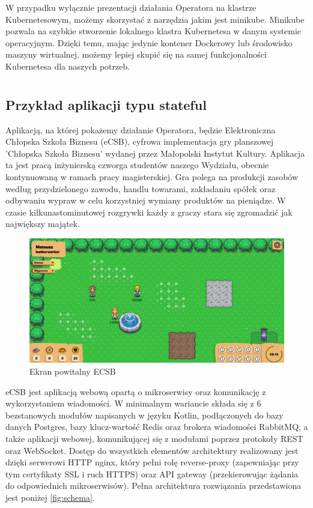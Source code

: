 \documentclass[polish]{aghengthesis}
\begin{document}
W przypadku wyłącznie prezentacji działania Operatora na klastrze Kubernetesowym, możemy skorzystać z narzędzia jakim jest minikube. Minikube pozwala na szybkie stworzenie lokalnego klastra Kubernetesa w danym systemie operacyjnym. Dzięki temu, mając jedynie kontener Dockerowy lub środowisko maszyny wirtualnej, możemy lepiej skupić się na samej funkcjonalności Kubernetesa dla naszych potrzeb. \cite{minikube}

\chapter{\ChapterTitleCaseStudyDesc}
\label{sec:opis-studium-przypadku}

\section{Przykład aplikacji typu stateful}
Aplikacją, na której pokażemy działanie Operatora, będzie Elektroniczna Chłopska Szkoła Biznesu (eCSB), cyfrowa implementacja gry planszowej 'Chłopska Szkoła Biznesu' wydanej przez Małopolski Instytut Kultury. Aplikacja ta jest pracą inżynierską czworga studentów naszego Wydziału, obecnie kontynuowaną w ramach pracy magisterskiej. Gra polega na produkcji zasobów według przydzielonego zawodu, handlu towarami, zakładaniu spółek oraz odbywaniu wypraw w celu korzystniej wymiany produktów na pieniądze. W czasie kilkunastominutowej rozgrywki każdy z graczy stara się zgromadzić jak największy majątek.

\begin{figure}[h!]
    \centering
    \includegraphics[width=1\linewidth]{documentation/resources/game_1.png}
    \caption{Ekran powitalny ECSB}
    \label{fig:stateful}
\end{figure}

eCSB jest aplikacją webową opartą o mikroserwisy oraz komunikację z wykorzystaniem wiadomości. W minimalnym wariancie składa się z 6 bezstanowych modułów napisanych w języku Kotlin, podłączonych do bazy danych Postgres, bazy klucz-wartość Redis oraz brokera wiadomości RabbitMQ, a także aplikacji webowej, komunikującej się z modułami poprzez protokoły REST oraz WebSocket. Dostęp do wszystkich elementów architektury realizowany jest dzięki serwerowi HTTP nginx, który pełni rolę reverse-proxy (zapewniając przy tym certyfikaty SSL i ruch HTTPS) oraz API gateway (przekierowując żądania do odpowiednich mikroserwisów). Pełna architektura rozwiązania przedstawiona jest poniżej \ref{fig:schema}.
\end{document}
